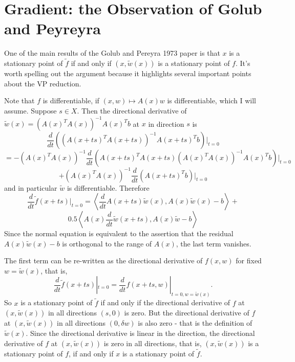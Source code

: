 \section{Gradient: the Observation of Golub and Peyreyra}

One of the main results of the Golub and Pereyra 1973 paper is that $x$ is a stationary point of $\tilde{f}$ if and only if $(x,\tilde{w}(x))$ is a stationary point of $f$. It's worth spelling out the argument because it highlights several important points about the VP reduction.

Note that $f$ is differentiable, if $(x,w)\mapsto A(x)w$ is differentiable, which I will assume. Suppose $s \in X$. Then the directional derivative of $\tilde{w}(x)=(A(x)^TA(x))^{-1}A(x)^Tb$ at $x$ in direction $s$ is 
$$
\frac{d}{dt}((A(x+ts)^TA(x+ts))^{-1}A(x+ts)^Tb)|_{t=0}
$$
$$
=-(A(x)^TA(x))^{-1}\frac{d}{dt}(A(x+ts)^TA(x+ts)(A(x)^TA(x))^{-1}A(x)^Tb)|_{t=0}
$$
$$
+ (A(x)^TA(x))^{-1}\frac{d}{dt}(A(x+ts)^Tb)|_{t=0}
$$
and in particular $\tilde{w}$ is differentiable. Therefore
$$
\frac{d}{dt}\tilde{f}(x+ts)|_{t=0} = \left\langle\frac{d}{dt}A(x+ts)\tilde{w}(x), A(x)\tilde{w}(x)-b\right\rangle + 
$$
$$
0.5\left\langle A(x)\frac{d}{dt}\tilde{w}(x+ts),A(x)\tilde{w}-b\right\rangle
$$
Since the normal equation is equivalent to the assertion that the residual $A(x)\tilde{w}(x)-b$ is orthogonal to the range of $A(x)$, the last term vanishes.

The first term can be re-written as the directional derivative of $f(x,w)$ for fixed $w=\tilde{w}(x)$, that is,
$$
\frac{d}{dt}\tilde{f}(x+ts)|_{t=0} = \frac{d}{dt}f(x+ts,w)|_{t=0,w=\tilde{w}(x)}.
$$
So $x$ is a stationary point of $\tilde{f}$ if and only if the directional derivative of $f$ at $(x,\tilde{w}(x))$ in all directions $(s,0)$ is zero. But the directional derivative of $f$ at $(x,\tilde{w}(x))$ in all directions $(0,\delta w)$ is also zero - that is the definition of $\tilde{w}(x)$. Since the directional derivative is linear in the direction, the directional derivative of $f$ at $(x,\tilde{w}(x))$ is zero in all directions, that is, $(x,\tilde{w}(x))$ is a stationary point of $f$, if and only if $x$ is a stationary point of $\tilde{f}$. 

